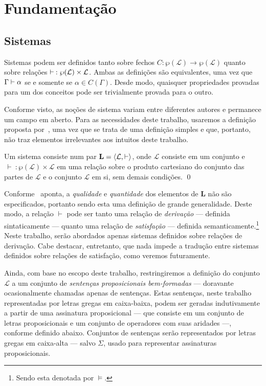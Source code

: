 \chapter{Fundamentação}

\section{Sistemas}

Sistemas podem ser definidos tanto sobre fechos $C:\wp(\mathcal{L})\to\wp(\mathcal{L})$ quanto sobre relações $\mathrel{\vdash}\: :\wp(\mathcal{L})\times\mathcal{L}$. Ambas as definições são equivalentes, uma vez que $\Gamma\mathrel{\vdash}\alpha$ se e somente se $\alpha\in C(\Gamma)$. Desde modo, quaisquer propriedades provadas para um dos conceitos pode ser trivialmente provada para o outro.

Conforme visto, as noções de sistema variam entre diferentes autores e permanece um campo em aberto. Para as necessidades deste trabalho, usaremos a definição proposta por~\cite{Beziau}, uma vez que se trata de uma definição simples e que, portanto, não traz elementos irrelevantes aos intuitos deste trabalho.

\begin{definition}[Sistema]
    Um sistema consiste num par $\mathbf{L} = \langle\mathcal{L}, \vdash\rangle$, onde $\mathcal{L}$ consiste em um conjunto e $\, \vdash \: : \wp(\mathcal{L}) \times \mathcal{L}$ em uma relação sobre o produto cartesiano do conjunto das partes de $\mathcal{L}$ e o conjunto $\mathcal{L}$ em si, sem demais condições.
    \qed{}
\end{definition}

Conforme~\cite{Beziau} aponta, a \emph{qualidade} e \emph{quantidade} dos elementos de $\mathbf{L}$ não são especificados, portanto sendo esta uma definição de grande generalidade. Deste modo, a relação $\vdash$ pode ser tanto uma relação de \emph{derivação} --- definida sintaticamente --- quanto uma relação de \emph{satisfação} --- definida semanticamente.\footnote{Sendo esta denotada por $\mathrel{\vDash}$.} Neste trabalho, serão abordados apenas sistemas definidos sobre relações de derivação. Cabe destacar, entretanto, que nada impede a tradução entre sistemas definidos sobre relações de satisfação, como veremos futuramente.

Ainda, com base no escopo deste trabalho, restringiremos a definição do conjunto $\mathcal{L}$ a um conjunto de \emph{sentenças proposicionais bem-formadas} --- doravante ocasionalmente chamadas apenas de sentenças. Estas sentenças, neste trabalho representadas por letras gregas em caixa-baixa, podem ser geradas indutivamente a partir de uma assinatura proposicional --- que consiste em um conjunto de letras proposicionais e um conjunto de operadores com suas aridades ---, conforme definido abaixo. Conjuntos de sentenças serão representados por letras gregas em caixa-alta --- salvo $\Sigma$, usado para representar assinaturas proposicionais.

